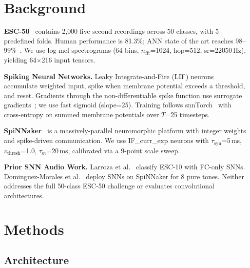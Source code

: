 \documentclass[sigconf,nonacm=false]{acmart}
\begin{document}
\section{Background}
\label{sec:background}

\textbf{ESC-50}~\cite{piczak2015} contains 2{,}000 five-second recordings across 50 classes, with 5 predefined folds. Human performance is 81.3\%; ANN state of the art reaches 98--99\%~\cite{omnivec2}. We use log-mel spectrograms (64 bins, $n_\text{fft}$=1024, hop=512, sr=22050\,Hz), yielding 64$\times$216 input tensors.

\textbf{Spiking Neural Networks.} Leaky Integrate-and-Fire (LIF) neurons accumulate weighted input, spike when membrane potential exceeds a threshold, and reset. Gradients through the non-differentiable spike function use surrogate gradients~\cite{neftci2019,zenke2021}; we use fast sigmoid (slope=25). Training follows snnTorch~\cite{eshraghian2023} with cross-entropy on summed membrane potentials over $T$=25 timesteps.

\textbf{SpiNNaker}~\cite{furber2014} is a massively-parallel neuromorphic platform with integer weights and spike-driven communication. We use IF\_curr\_exp neurons with $\tau_\text{syn}$=5\,ms, $v_\text{thresh}$=1.0, $\tau_m$=20\,ms, calibrated via a 9-point scale sweep.

\textbf{Prior SNN Audio Work.} Larroza et al.~\cite{larroza2025} classify ESC-10 with FC-only SNNs. Dominguez-Morales et al.~\cite{dominguez2016} deploy SNNs on SpiNNaker for 8 pure tones. Neither addresses the full 50-class ESC-50 challenge or evaluates convolutional architectures.

\section{Methods}
\label{sec:methods}

\subsection{Architecture}
\end{document}
